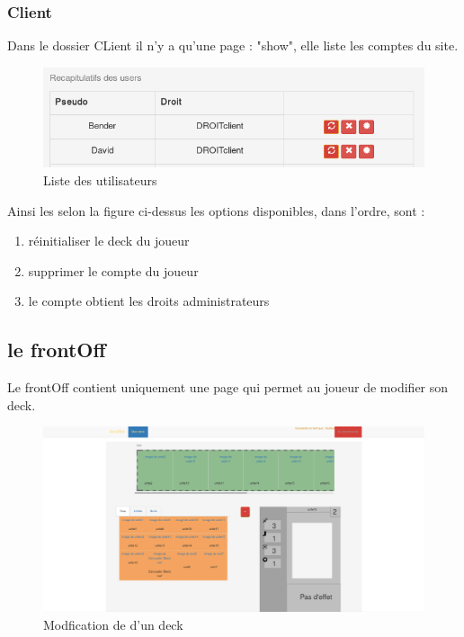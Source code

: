 \documentclass[a4paper, titlepage]{livret}
\begin{document}
        \subsubsection{Client}
         Dans le dossier CLient il n'y a qu'une page : "show", elle liste les comptes du site. 
        \begin{figure}[th]
      		\begin{center}
        	\includegraphics[scale=0.4]{Assets/liste_user.png}
        	\caption{Liste des utilisateurs}
        	\label{fig5}
      		\end{center}
    	\end{figure}

	Ainsi les selon la figure ci-dessus les options disponibles, dans l'ordre, sont : 
	\begin{enumerate}
		\item réinitialiser le deck du joueur
		\item supprimer le compte du joueur
		\item le compte obtient les droits administrateurs
	\end{enumerate}
         
	\subsection{le frontOff}
        Le frontOff contient uniquement une page qui permet au joueur de modifier son deck.
    \begin{figure}[th]
      \begin{center}
        \includegraphics[scale=0.2]{Assets/site.png}
        \caption{Modfication de d'un deck}
        \label{fig6}
      \end{center}
    \end{figure}
\end{document}
